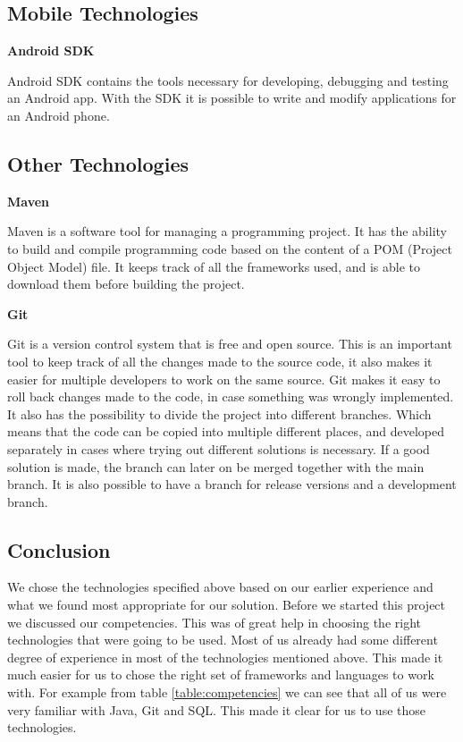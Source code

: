 \subsection{Mobile Technologies}

\textbf{Android SDK} \nocite{AndroidSDK}

Android SDK contains the tools necessary for developing, debugging and testing an Android app.
With the SDK it is possible to write and modify applications for an Android phone.

\subsection{Other Technologies}

\textbf{Maven} \nocite{Maven}

Maven is a software tool for managing a programming project.
It has the ability to build and compile programming code based on the content of a POM (Project Object Model) file.
It keeps track of all the frameworks used, and is able to download them before building the project.

\textbf{Git} \nocite{Git}

Git is a version control system that is free and open source.
This is an important tool to keep track of all the changes made to the source code, it also makes it easier for multiple developers to work on the same source.
Git makes it easy to roll back changes made to the code, in case something was wrongly implemented.
It also has the possibility to divide the project into different branches.
Which means that the code can be copied into multiple different places, and developed separately in cases where trying out different solutions is necessary.
If a good solution is made, the branch can later on be merged together with the main branch.
It is also possible to have a branch for release versions and a development branch.

\subsection{Conclusion}

We chose the technologies specified above based on our earlier experience and what we found most appropriate for our solution.
Before we started this project we discussed our competencies.
This was of great help in choosing the right technologies that were going to be used.
Most of us already had some different degree of experience in most of the technologies mentioned above.
This made it much easier for us to chose the right set of frameworks and languages to work with.
For example from table \ref{table:competencies} we can see that all of us were very familiar with Java, Git and SQL.
This made it clear for us to use those technologies.

